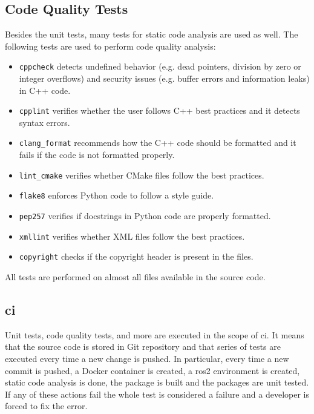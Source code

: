 \subsection{Code Quality Tests}
Besides the unit tests, many tests for static code analysis are used as well.
The following tests are used to perform code quality analysis:
\begin{itemize}
    \item \texttt{cppcheck} detects undefined behavior (e.g. dead pointers, division by zero or integer overflows) and security issues (e.g. buffer errors and information leaks) in C++ code.
    \item \texttt{cpplint} verifies whether the user follows C++ best practices and it detects syntax errors.
    \item \texttt{clang\_format} recommends how the C++ code should be formatted and it fails if the code is not formatted properly. 
    \item \texttt{lint\_cmake} verifies whether CMake files follow the best practices.
    \item \texttt{flake8} enforces Python code to follow a style guide.
    \item \texttt{pep257} verifies if docstrings in Python code are properly formatted.
    \item \texttt{xmllint} verifies whether XML files follow the best practices.
    \item \texttt{copyright} checks if the copyright header is present in the files.
\end{itemize}

All tests are performed on almost all files available in the source code. 

\subsection{\acl{ci}}
Unit tests, code quality tests, and more are executed in the scope of \ac{ci}.
It means that the source code is stored in Git repository and that series of tests are executed every time a new change is pushed.
In particular, every time a new commit is pushed, a Docker container is created, a \ac{ros2} environment is created, static code analysis is done, the package is built and the packages are unit tested.
If any of these actions fail the whole test is considered a failure and a developer is forced to fix the error.
